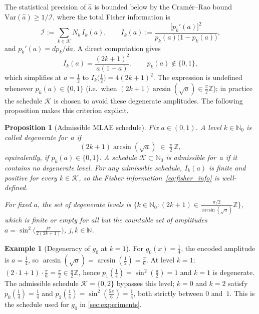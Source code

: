 \documentclass[12pt,a4paper]{article}
\theoremstyle{plain}
\newtheorem{proposition}[proposition]{Proposition}
\theoremstyle{definition}
\newtheorem{example}[example]{Example}
\theoremstyle{remark}
\begin{document}
The statistical precision of $\hat{a}$ is bounded below by the
Cram\'{e}r--Rao bound $\mathrm{Var}(\hat{a})\geq 1/\mathcal{I}$,
where the total Fisher information is
\begin{equation}
  \mathcal{I} := \sum_{k\in\mathcal{K}} N_k\,I_k(a),
  \qquad
  I_k(a) :=
  \frac{\bigl[p_k'(a)\bigr]^2}{p_k(a)\bigl(1-p_k(a)\bigr)},
  \label{eq:fisher_info}
\end{equation}
and $p_k'(a) = dp_k/da$.
A direct computation gives
\begin{equation}
  I_k(a) = \frac{(2k+1)^2}{a(1-a)},
  \qquad p_k(a)\notin\{0,1\},
  \label{eq:fisher_explicit}
\end{equation}
which simplifies at $a=\tfrac{1}{2}$ to
$I_k\!\bigl(\tfrac{1}{2}\bigr) = 4(2k+1)^2$.
The expression is undefined whenever $p_k(a)\in\{0,1\}$
(i.e.\ when $(2k+1)\arcsin(\sqrt{a})\in\tfrac{\pi}{2}\mathbb{Z}$);
in practice the schedule $\mathcal{K}$ is chosen to avoid these
degenerate amplitudes.
The following proposition makes this criterion explicit.

\begin{proposition}[Admissible MLAE schedule]
\label{prop:admissible_schedule}
Fix $a\in(0,1)$.
A level $k\in\mathbb{N}_0$ is called \emph{degenerate for~$a$} if
\begin{equation}
  (2k+1)\arcsin(\!\sqrt{a})\;\in\;\tfrac{\pi}{2}\,\mathbb{Z},
  \label{eq:degenerate_condition}
\end{equation}
equivalently, if $p_k(a)\in\{0,1\}$.
A schedule $\mathcal{K}\subset\mathbb{N}_0$ is \emph{admissible for~$a$}
if it contains no degenerate level.
For any admissible schedule, $I_k(a)$ is finite and positive for every
$k\in\mathcal{K}$, so the Fisher information~\eqref{eq:fisher_info}
is well-defined.

For fixed $a$, the set of degenerate levels is
$\bigl\{k\in\mathbb{N}_0 : (2k+1) \in \frac{\pi/2}{\arcsin(\sqrt{a})}\mathbb{Z}\bigr\}$,
which is finite or empty for all but the countable set of amplitudes
$a = \sin^2\!\bigl(\frac{j\pi}{2(2k+1)}\bigr)$, $j,k\in\mathbb{N}$.
\end{proposition}

\begin{example}[Degeneracy of $g_0$ at $k=1$]
\label{ex:degeneracy_g0}
For $g_0(x)=\tfrac{1}{4}$, the encoded amplitude is $a=\tfrac{1}{4}$,
so $\arcsin(\!\sqrt{a})=\arcsin(\tfrac{1}{2})=\tfrac{\pi}{6}$.
At level $k=1$: $(2\cdot 1+1)\cdot\tfrac{\pi}{6}=\tfrac{\pi}{2}\in\tfrac{\pi}{2}\mathbb{Z}$,
hence $p_1(\tfrac{1}{4})=\sin^2(\tfrac{\pi}{2})=1$ and $k=1$ is
degenerate.
The admissible schedule $\mathcal{K}=\{0,2\}$ bypasses this level;
$k=0$ and $k=2$ satisfy $p_0(\tfrac{1}{4})=\tfrac{1}{4}$
and $p_2(\tfrac{1}{4})=\sin^2(\tfrac{5\pi}{6})=\tfrac{1}{4}$,
both strictly between $0$ and~$1$.
This is the schedule used for $g_0$ in \cref{sec:experiments}.
\end{example}
\end{document}
